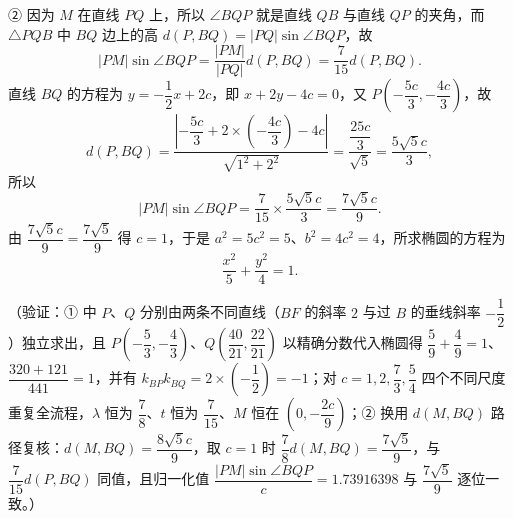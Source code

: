 \begin{answer}
② 因为 \(M\) 在直线 \(PQ\) 上，所以 \(\angle BQP\) 就是直线 \(QB\) 与直线 \(QP\) 的夹角，而 \(\triangle PQB\) 中 \(BQ\) 边上的高 \(d(P,BQ)=|PQ|\sin\angle BQP\)，故
\nopagebreak[4]
\[
|PM|\sin\angle BQP=\dfrac{|PM|}{|PQ|}d(P,BQ)=\dfrac{7}{15}d(P,BQ).
\]
直线 \(BQ\) 的方程为 \(y=-\dfrac{1}{2}x+2c\)，即 \(x+2y-4c=0\)，又 \(P\left(-\dfrac{5c}{3},-\dfrac{4c}{3}\right)\)，故
\nopagebreak[4]
\[
d(P,BQ)=\dfrac{\left|-\dfrac{5c}{3}+2\times\left(-\dfrac{4c}{3}\right)-4c\right|}{\sqrt{1^{2}+2^{2}}}=\dfrac{\dfrac{25c}{3}}{\sqrt{5}}=\dfrac{5\sqrt{5}c}{3},
\]
所以
\nopagebreak[4]
\[
|PM|\sin\angle BQP=\dfrac{7}{15}\times\dfrac{5\sqrt{5}c}{3}=\dfrac{7\sqrt{5}c}{9}.
\]
由 \(\dfrac{7\sqrt{5}c}{9}=\dfrac{7\sqrt{5}}{9}\) 得 \(c=1\)，于是 \(a^{2}=5c^{2}=5\)、\(b^{2}=4c^{2}=4\)，所求椭圆的方程为
\nopagebreak[4]
\[
\dfrac{x^{2}}{5}+\dfrac{y^{2}}{4}=1.
\]

（验证：① 中 \(P\)、\(Q\) 分别由两条不同直线（\(BF\) 的斜率 \(2\) 与过 \(B\) 的垂线斜率 \(-\dfrac{1}{2}\)）独立求出，且 \(P\left(-\dfrac{5}{3},-\dfrac{4}{3}\right)\)、\(Q\left(\dfrac{40}{21},\dfrac{22}{21}\right)\) 以精确分数代入椭圆得 \(\dfrac{5}{9}+\dfrac{4}{9}=1\)、\(\dfrac{320+121}{441}=1\)，并有 \(k_{BP}k_{BQ}=2\times\left(-\dfrac{1}{2}\right)=-1\)；对 \(c=1,2,\dfrac{7}{3},\dfrac{5}{4}\) 四个不同尺度重复全流程，\(\lambda\) 恒为 \(\dfrac{7}{8}\)、\(t\) 恒为 \(\dfrac{7}{15}\)、\(M\) 恒在 \(\left(0,-\dfrac{2c}{9}\right)\)；② 换用 \(d(M,BQ)\) 路径复核：\(d(M,BQ)=\dfrac{8\sqrt{5}c}{9}\)，取 \(c=1\) 时 \(\dfrac{7}{8}d(M,BQ)=\dfrac{7\sqrt{5}}{9}\)，与 \(\dfrac{7}{15}d(P,BQ)\) 同值，且归一化值 \(\dfrac{|PM|\sin\angle BQP}{c}=1.73916398\) 与 \(\dfrac{7\sqrt{5}}{9}\) 逐位一致。）



\end{answer}
